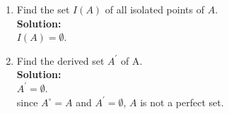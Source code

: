 \documentclass{article}
\begin{document}
\begin{enumerate}
\begin{enumerate}
\item Find the set $I(A)$ of all isolated points of $A$.\\

\textbf{Solution:} \\
$I(A) = \emptyset$.\\

\item Find the derived set $A^\prime$ of A.\\

\textbf{Solution:} \\
$A^\prime = \emptyset$.\\
since $A^\circ = A$ and $A^\prime = \emptyset$, $A$ is not a perfect set.\\


\end{enumerate}

\end{enumerate}
\end{document}

